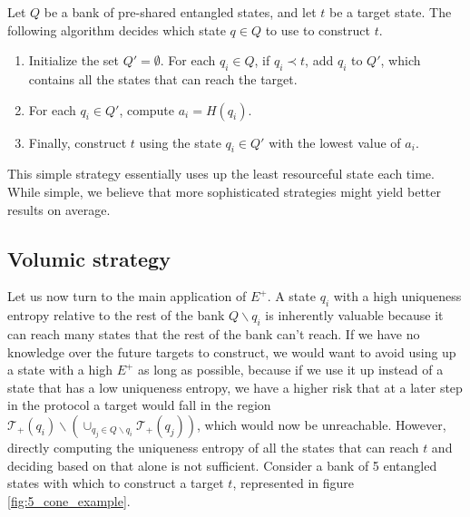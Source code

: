 \begin{definition}
    Let $Q$ be a bank of pre-shared entangled states, and let $t$ be a target state. The following algorithm decides which state $q \in Q$ to use to construct $t$.
    \begin{enumerate}
        \item Initialize the set $Q' = \emptyset$. For each $q_i \in Q$, if $q_i \prec t$, add $q_i$ to $Q'$, which contains all the states that can reach the target.
        \item For each $q_i \in Q'$, compute $a_i = H(q_i)$.
        \item Finally, construct $t$ using the state $q_i \in Q'$ with the lowest value of $a_i$.
    \end{enumerate}
\end{definition}

This simple strategy essentially uses up the least resourceful state each time. While simple, we believe that more sophisticated strategies might yield better results on average.



\subsection{Volumic strategy}

Let us now turn to the main application of $E^+$. A state $q_i$ with a high uniqueness entropy relative to the rest of the bank $Q \backslash q_i$ is inherently valuable because it can reach many states that the rest of the bank can't reach. If we have no knowledge over the future targets to construct, we would want to avoid using up a state with a high $E^+$ as long as possible, because if we use it up instead of a state that has a low uniqueness entropy, we have a higher risk that at a later step in the protocol a target would fall in the region
$\mathcal{T}_+(q_i) \backslash \left(\cup_{q_j \in Q \backslash q_i} \mathcal{T}_+(q_j)\right)$, which would now be unreachable. However, directly computing the uniqueness entropy of all the states that can reach $t$ and deciding based on that alone is not sufficient. Consider a bank of 5 entangled states with which to construct a target $t$, represented in figure \ref{fig:5_cone_example}.

